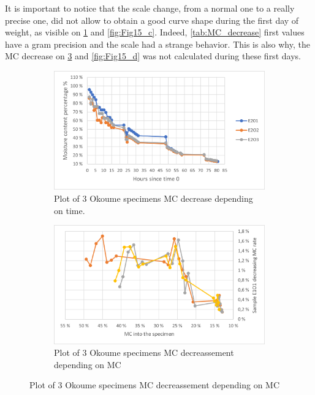 It is important to notice that the scale change, from a normal one to a really precise one, did not allow to obtain a good curve shape during the first day of weight, as visible on \ref{fig:Fig15_a} and \ref{fig:Fig15_c}. Indeed, \ref{tab:MC_decrease} first values have a gram precision and the scale had a strange behavior. This is also why, the MC decrease on \ref{fig:Fig15_b} and \ref{fig:Fig15_d} was not calculated during these first days. 
\begin{figure}[th]
	\centering
	\begin{subfigure}{0.48\linewidth}
		\includegraphics[width=\textwidth]{Figures/Okoume_MCdecreas}
		\caption[Okoume MC decrease depending on time.]{Plot of 3 Okoume specimens MC decrease depending on time.}
		\label{fig:Fig15_a}
	\end{subfigure}
	\hfill
	\begin{subfigure}{0.48\linewidth}
		\includegraphics[width=\textwidth]{Figures/Okoume_MCevol}
		\caption[MC decreassement depending on MC for 3 Okoume samples]{Plot of 3 Okoume specimens MC decreassement depending on MC}
		\label{fig:Fig15_b}
	\end{subfigure}

\end{figure}
